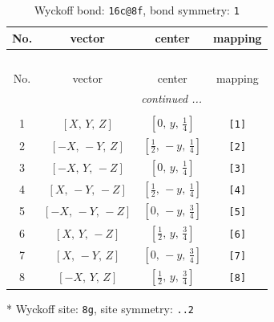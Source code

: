 \documentclass[fleqn,8pt]{jsarticle}
\begin{document}
\renewcommand{\arraystretch}{1.2}
\begin{longtable}{cccc}
\caption{Wyckoff bond: {\tt 16c@8f}, bond symmetry: {\tt 1}}
 \\
 \hline \hline
No. & vector & center & mapping \\ \hline \endfirsthead

\multicolumn{3}{l}{\tablename\ \thetable{}} \\
 \hline \hline
No. & vector & center & mapping \\ \hline \endhead

 \hline \hline
\multicolumn{3}{r}{\footnotesize\it continued ...} \\ \endfoot

 \hline \hline
\multicolumn{3}{r}{} \\ \endlastfoot

1 & $\left[ X,\, Y,\, Z \right]$ & $\left[ 0,\, y,\, \frac{1}{4} \right]$ & {\tt [1]} \\ \hline
2 & $\left[ - X,\, - Y,\, Z \right]$ & $\left[ \frac{1}{2},\, - y,\, \frac{1}{4} \right]$ & {\tt [2]} \\ \hline
3 & $\left[ - X,\, Y,\, - Z \right]$ & $\left[ 0,\, y,\, \frac{1}{4} \right]$ & {\tt [3]} \\ \hline
4 & $\left[ X,\, - Y,\, - Z \right]$ & $\left[ \frac{1}{2},\, - y,\, \frac{1}{4} \right]$ & {\tt [4]} \\ \hline
5 & $\left[ - X,\, - Y,\, - Z \right]$ & $\left[ 0,\, - y,\, \frac{3}{4} \right]$ & {\tt [5]} \\ \hline
6 & $\left[ X,\, Y,\, - Z \right]$ & $\left[ \frac{1}{2},\, y,\, \frac{3}{4} \right]$ & {\tt [6]} \\ \hline
7 & $\left[ X,\, - Y,\, Z \right]$ & $\left[ 0,\, - y,\, \frac{3}{4} \right]$ & {\tt [7]} \\ \hline
8 & $\left[ - X,\, Y,\, Z \right]$ & $\left[ \frac{1}{2},\, y,\, \frac{3}{4} \right]$ & {\tt [8]} \\
\end{longtable}
* Wyckoff site: {\tt 8g}, site symmetry: {\tt ..2}
\renewcommand{\arraystretch}{1.2}
\end{document}
